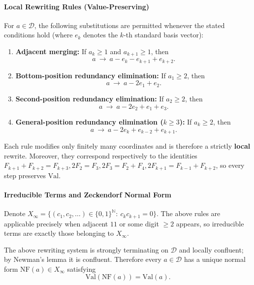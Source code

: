 \paragraph{Local Rewriting Rules (Value-Preserving)}
For $a\in\mathcal{D}$, the following substitutions are permitted whenever the stated conditions hold (where $e_k$ denotes the $k$-th standard basis vector):
\begin{enumerate}
  \renewcommand{\theenumi}{R\arabic{enumi}}
  \renewcommand{\labelenumi}{(\theenumi)}
  \item \label{rule:fold:adj}\textbf{Adjacent merging:} If $a_k\ge 1$ and $a_{k+1}\ge 1$, then
  \[
  a\ \to\ a-e_k-e_{k+1}+e_{k+2}.
  \]
  \item \label{rule:fold:dedup1}\textbf{Bottom-position redundancy elimination:} If $a_1\ge 2$, then
  \[
  a\ \to\ a-2e_1+e_2.
  \]
  \item \label{rule:fold:dedup2}\textbf{Second-position redundancy elimination:} If $a_2\ge 2$, then
  \[
  a\ \to\ a-2e_2+e_1+e_3.
  \]
  \item \label{rule:fold:dedupk}\textbf{General-position redundancy elimination ($k\ge 3$):} If $a_k\ge 2$, then
  \[
  a\ \to\ a-2e_k+e_{k-2}+e_{k+1}.
  \]
\end{enumerate}
Each rule modifies only finitely many coordinates and is therefore a strictly \textbf{local} rewrite. Moreover, they correspond respectively to the identities
\(
F_{k+1}+F_{k+2}=F_{k+3},
2F_2=F_3,
2F_3=F_2+F_4,
2F_{k+1}=F_{k-1}+F_{k+2}
\), so every step preserves $\mathrm{Val}$.

\paragraph{Irreducible Terms and Zeckendorf Normal Form}
Denote $X_\infty=\{(c_1,c_2,\dots)\in\{0,1\}^{\mathbb{N}}:\ c_kc_{k+1}=0\}$. The above rules are applicable precisely when adjacent $11$ or some digit $\ge 2$ appears, so irreducible terms are exactly those belonging to $X_\infty$.

\begin{proposition}\label{prop:fold-rewrite-newman}
The above rewriting system is strongly terminating on $\mathcal{D}$ and locally confluent; by Newman's lemma it is confluent. Therefore every $a\in\mathcal{D}$ has a unique normal form $\mathrm{NF}(a)\in X_\infty$ satisfying
\[
\mathrm{Val}(\mathrm{NF}(a))=\mathrm{Val}(a).
\]
\end{proposition}

